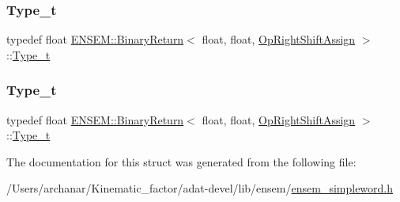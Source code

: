 \mbox{\label{structENSEM_1_1BinaryReturn_3_01float_00_01float_00_01OpRightShiftAssign_01_4_a79bb667fa95c821edd1a65ad18229767}} 
\subsubsection{\texorpdfstring{Type\_t}{Type\_t}\hspace{0.1cm}{\footnotesize\ttfamily [2/3]}}
{\footnotesize\ttfamily typedef float \mbox{\hyperlink{structENSEM_1_1BinaryReturn}{E\+N\+S\+E\+M\+::\+Binary\+Return}}$<$ float, float, \mbox{\hyperlink{structENSEM_1_1OpRightShiftAssign}{Op\+Right\+Shift\+Assign}} $>$\+::\mbox{\hyperlink{structENSEM_1_1BinaryReturn_3_01float_00_01float_00_01OpRightShiftAssign_01_4_a79bb667fa95c821edd1a65ad18229767}{Type\+\_\+t}}}

\mbox{\label{structENSEM_1_1BinaryReturn_3_01float_00_01float_00_01OpRightShiftAssign_01_4_a79bb667fa95c821edd1a65ad18229767}} 
\subsubsection{\texorpdfstring{Type\_t}{Type\_t}\hspace{0.1cm}{\footnotesize\ttfamily [3/3]}}
{\footnotesize\ttfamily typedef float \mbox{\hyperlink{structENSEM_1_1BinaryReturn}{E\+N\+S\+E\+M\+::\+Binary\+Return}}$<$ float, float, \mbox{\hyperlink{structENSEM_1_1OpRightShiftAssign}{Op\+Right\+Shift\+Assign}} $>$\+::\mbox{\hyperlink{structENSEM_1_1BinaryReturn_3_01float_00_01float_00_01OpRightShiftAssign_01_4_a79bb667fa95c821edd1a65ad18229767}{Type\+\_\+t}}}



The documentation for this struct was generated from the following file\+:\begin{DoxyCompactItemize}
\item 
/\+Users/archanar/\+Kinematic\+\_\+factor/adat-\/devel/lib/ensem/\mbox{\hyperlink{adat-devel_2lib_2ensem_2ensem__simpleword_8h}{ensem\+\_\+simpleword.\+h}}\end{DoxyCompactItemize}
